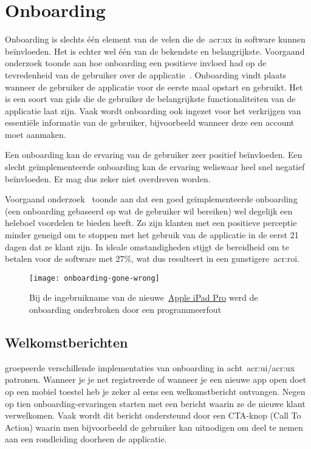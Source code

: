 \section{Onboarding}
\label{sec:onboarding}

Onboarding is slechts één element van de velen die de~\acrlong{acr:ux} in software kunnen beïnvloeden. Het is echter wel één van de bekendste en belangrijkste. Voorgaand onderzoek toonde aan hoe onboarding een positieve invloed had op de tevredenheid van de gebruiker over de applicatie~\autocite{Cardoso2017}. Onboarding vindt plaats wanneer de gebruiker de applicatie voor de eerste maal opstart en gebruikt. Het is een soort van gids die de gebruiker de belangrijkste functionaliteiten van de applicatie laat zijn. Vaak wordt onboarding ook ingezet voor het verkrijgen van essentiële informatie van de gebruiker, bijvoorbeeld wanneer deze een account moet aanmaken.

Een onboarding kan de ervaring van de gebruiker zeer positief beïnvloeden. Een slecht geïmplementeerde onboarding kan de ervaring weliswaar heel snel negatief beïnvloeden. Er mag dus zeker niet overdreven worden.

Voorgaand onderzoek~\autocite{Desai2019} toonde aan dat een goed geïmplementeerde onboarding (een onboarding gebaseerd op wat de gebruiker wil bereiken) wel degelijk een heleboel voordelen te bieden heeft. Zo zijn klanten met een positieve perceptie minder geneigd om te stoppen met het gebruik van de applicatie in de eerst 21 dagen dat ze klant zijn. In ideale omstandigheden stijgt de bereidheid om te betalen voor de software met 27\%, wat dus resulteert in een gunstigere~\acrfull{acr:roi}.

\begin{figure}
    \centering
    \texttt{[image: onboarding-gone-wrong]}
    \caption[Implementatiefout bij onboarding]{Bij de ingebruikname van de nieuwe~\href{https://www.apple.com/ipad-pro/}{Apple iPad Pro} werd de onboarding onderbroken door een programmeerfout}
    \label{fig:onboarding:fout}
\end{figure}

\subsection{Welkomstberichten}
\label{sec:onboarding:welkomstberichten}

\textcite{Balboni2018} groepeerde verschillende implementaties van onboarding in acht~\acrshort{acr:ui}/\acrshort{acr:ux} patronen. Wanneer je je net registreerde of wanneer je een nieuwe app open doet op een mobiel toestel heb je zeker al eens een welkomstbericht ontvangen. Negen op tien onboarding-ervaringen starten met een bericht waarin ze de nieuwe klant verwelkomen. Vaak wordt dit bericht ondersteund door een CTA-knop (Call To Action) waarin men bijvoorbeeld de gebruiker kan uitnodigen om deel te nemen aan een rondleiding doorheen de applicatie.

